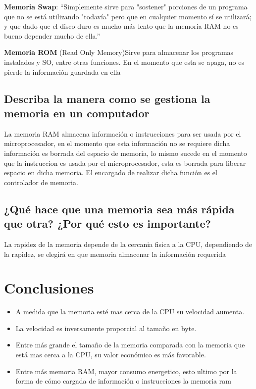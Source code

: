\documentclass[12pt,letterpaper]{article}
\begin{document}
        \textbf{Memoria Swap}: ``Simplemente sirve para "sostener" porciones de un programa que no se está utilizando "todavía" pero que en cualquier momento sí se utilizará; y que dado que el disco duro es mucho más lento que la memoria RAM no es bueno depender mucho de ella.''\cite{GuiaProfesor}

        \textbf{Memoria ROM} (Read Only Memory)Sirve para almacenar los programas instalados y SO, entre otras funciones. En el momento que esta se apaga, no es pierde la información guardada en ella

        
    \subsection{Describa la manera como se gestiona la memoria en un computador}
        La memoria RAM almacena información o instrucciones para ser usada por el microprocesador, en el momento que esta información no se requiere dicha información es borrada del espacio de memoria, lo mismo sucede en el momento que la instruccion es usada por el microprocesador, esta es borrada para liberar espacio en dicha memoria. El encargado de realizar dicha función es el controlador de memoria.       


    \subsection{¿Qué hace que una memoria sea más rápida que otra? ¿Por qué esto es importante?}
        La rapidez de la memoria depende de la cercania fisica a la CPU, dependiendo de la rapidez, se elegirá en que memoria almacenar la información requerida 
        
\newpage

\section{Conclusiones}
    \begin{itemize}
     \item A medida que la memoria esté mas cerca de la CPU su velocidad aumenta.
     \item La velocidad es inversamente proporcial al tamaño en byte.
     \item Entre más grande el tamaño de la memoria comparada con la memoria que está mas cerca a la CPU, su valor económico es más favorable.
     \item Entre más memoria RAM, mayor consumo energetico, esto ultimo por la forma de cómo cargada de información o instrucciones la memoria ram
    \end{itemize}

\newpage



\end{document}
